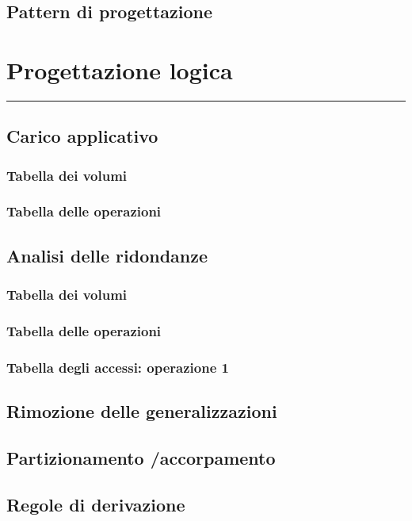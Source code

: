 \documentclass[legalpaper]{article}
\begin{document}
\subsection{Pattern di progettazione}

\newpage
\section{Progettazione logica}
\rule{\linewidth}{1.5pt}

\subsection{Carico applicativo}
\subsubsection{Tabella dei volumi}
\subsubsection{Tabella delle operazioni}

\subsection{Analisi delle ridondanze}
\subsubsection{Tabella dei volumi}
\subsubsection{Tabella delle operazioni}
\subsubsection{Tabella degli accessi: operazione 1}

\subsection{Rimozione delle generalizzazioni}

\subsection{Partizionamento /accorpamento}

\subsection{Regole di derivazione}
\end{document}

